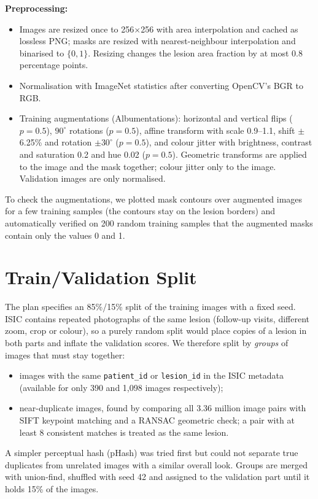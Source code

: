 \documentclass[11pt,a4paper]{article}
\begin{document}
\textbf{Preprocessing:}
\begin{itemize}[noitemsep]
  \item Images are resized once to 256$\times$256 with area interpolation and cached as lossless
        PNG; masks are resized with nearest-neighbour interpolation and binarised to $\{0, 1\}$.
        Resizing changes the lesion area fraction by at most 0.8 percentage points.
  \item Normalisation with ImageNet statistics after converting OpenCV's BGR to RGB.
  \item Training augmentations (Albumentations): horizontal and vertical flips ($p=0.5$),
        $90^\circ$ rotations ($p=0.5$), affine transform with scale 0.9--1.1, shift $\pm$6.25\%
        and rotation $\pm 30^\circ$ ($p=0.5$), and colour jitter with brightness, contrast and
        saturation 0.2 and hue 0.02 ($p=0.5$). Geometric transforms are applied to the image and
        the mask together; colour jitter only to the image. Validation images are only normalised.
\end{itemize}
To check the augmentations, we plotted mask contours over augmented images for a few training
samples (the contours stay on the lesion borders) and automatically verified on 200 random
training samples that the augmented masks contain only the values 0 and 1.

\section{Train/Validation Split}
\label{sec:split}

The plan specifies an 85\%/15\% split of the training images with a fixed seed. ISIC contains
repeated photographs of the same lesion (follow-up visits, different zoom, crop or colour), so a
purely random split would place copies of a lesion in both parts and inflate the validation
scores. We therefore split by \emph{groups} of images that must stay together:
\begin{itemize}[noitemsep]
  \item images with the same \texttt{patient\_id} or \texttt{lesion\_id} in the ISIC metadata
        (available for only 390 and 1,098 images respectively);
  \item near-duplicate images, found by comparing all 3.36 million image pairs with SIFT keypoint
        matching and a RANSAC geometric check; a pair with at least 8 consistent matches is
        treated as the same lesion.
\end{itemize}
A simpler perceptual hash (pHash) was tried first but could not separate true duplicates from
unrelated images with a similar overall look. Groups are merged with union-find, shuffled with
seed 42 and assigned to the validation part until it holds 15\% of the images.
\end{document}
